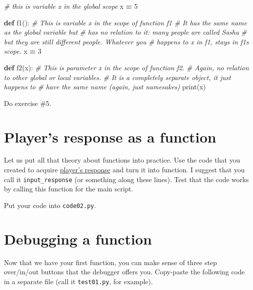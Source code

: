 \documentclass[
]{book}
\newenvironment{Shaded}{\begin{snugshade}}{\end{snugshade}}
\newcommand{\BuiltInTok}[1]{#1}
\newcommand{\CommentTok}[1]{\textcolor[rgb]{0.56,0.35,0.01}{\textit{#1}}}
\newcommand{\DecValTok}[1]{\textcolor[rgb]{0.00,0.00,0.81}{#1}}
\newcommand{\KeywordTok}[1]{\textcolor[rgb]{0.13,0.29,0.53}{\textbf{#1}}}
\newcommand{\NormalTok}[1]{#1}
\newcommand{\OperatorTok}[1]{\textcolor[rgb]{0.81,0.36,0.00}{\textbf{#1}}}
\begin{document}
\begin{Shaded}
\begin{Highlighting}[]
\CommentTok{\# this is variable \textasciigrave{}x\textasciigrave{} in the global scope}
\NormalTok{x  }\OperatorTok{=} \DecValTok{5} 

\KeywordTok{def}\NormalTok{ f1():}
  \CommentTok{\# This is variable \textasciigrave{}x\textasciigrave{} in the scope of function f1}
  \CommentTok{\# It has the same name as the global variable but}
  \CommentTok{\# has no relation to it: many people are called Sasha }
  \CommentTok{\# but they are still different people. Whatever you}
  \CommentTok{\# happens to \textasciigrave{}x\textasciigrave{} in f1, stays in f1\textquotesingle{}s scope.}
\NormalTok{  x }\OperatorTok{=} \DecValTok{3}
  
  
\KeywordTok{def}\NormalTok{ f2(x):}
  \CommentTok{\# This is parameter \textasciigrave{}x\textasciigrave{} in the scope of function f2.}
  \CommentTok{\# Again, no relation to other global or local variables.}
  \CommentTok{\# It is a completely separate object, it just happens to }
  \CommentTok{\# have the same name (again, just namesakes)}
  \BuiltInTok{print}\NormalTok{(x)}
\end{Highlighting}
\end{Shaded}

Do exercise \#5.

\hypertarget{players-response-as-a-function}{%
\section{Player's response as a function}\label{players-response-as-a-function}}

Let us put all that theory about functions into practice. Use the code that you created to acquire \protect\hyperlink{guess-the-number-players-response}{player's response} and turn it into function. I suggest that you call it \texttt{input\_response} (or something along these lines). Test that the code works by calling this function for the main script.

Put your code into \texttt{code02.py}.

\hypertarget{debugging-a-function}{%
\section{Debugging a function}\label{debugging-a-function}}

Now that we have your first function, you can make sense of three step over/in/out buttons that the debugger offers you. Copy-paste the following code in a separate file (call it \texttt{test01.py}, for example).
\end{document}
